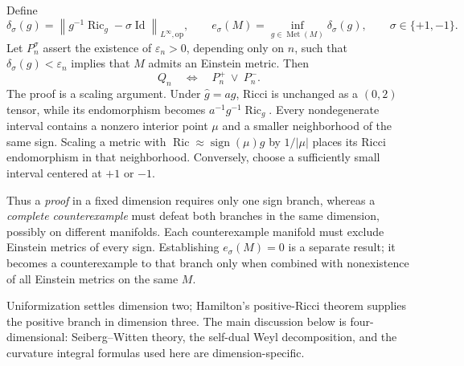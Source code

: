 \documentclass[a4paper,11pt]{article}
\numberwithin{equation}{section}
\theoremstyle{definition}
\newcommand{\Ric}{\operatorname{Ric}}
\newcommand{\Met}{\operatorname{Met}}
\newcommand{\Id}{\operatorname{Id}}
\newcommand{\op}{\mathrm{op}}
\newcommand{\norm}[1]{\left\lVert#1\right\rVert}
\begin{document}
Define
\begin{equation}\label{eq:defect}
 \delta_\sigma(g)=\norm{g^{-1}\Ric_g-\sigma\Id}_{L^\infty,\op},\qquad
 e_\sigma(M)=\inf_{g\in\Met(M)}\delta_\sigma(g),\qquad \sigma\in\{+1,-1\}.
\end{equation}
Let $P_n^\sigma$ assert the existence of $\varepsilon_n>0$, depending only on $n$, such that $\delta_\sigma(g)<\varepsilon_n$ implies that $M$ admits an Einstein metric. Then
\begin{equation}\label{eq:branches}
 Q_n\quad\Longleftrightarrow\quad P_n^+\ \lor\ P_n^-.
\end{equation}
The proof is a scaling argument. Under $\widehat g=ag$, Ricci is unchanged as a $(0,2)$ tensor, while its endomorphism becomes $a^{-1}g^{-1}\Ric_g$. Every nondegenerate interval contains a nonzero interior point $\mu$ and a smaller neighborhood of the same sign. Scaling a metric with $\Ric\approx\operatorname{sign}(\mu)g$ by $1/|\mu|$ places its Ricci endomorphism in that neighborhood. Conversely, choose a sufficiently small interval centered at $+1$ or $-1$.

Thus a \emph{proof} in a fixed dimension requires only one sign branch, whereas a \emph{complete counterexample} must defeat both branches in the same dimension, possibly on different manifolds. Each counterexample manifold must exclude Einstein metrics of every sign. Establishing $e_\sigma(M)=0$ is a separate result; it becomes a counterexample to that branch only when combined with nonexistence of all Einstein metrics on the same $M$.

Uniformization settles dimension two; Hamilton's positive-Ricci theorem supplies the positive branch in dimension three. The main discussion below is four-dimensional: Seiberg--Witten theory, the self-dual Weyl decomposition, and the curvature integral formulas used here are dimension-specific.
\end{document}
